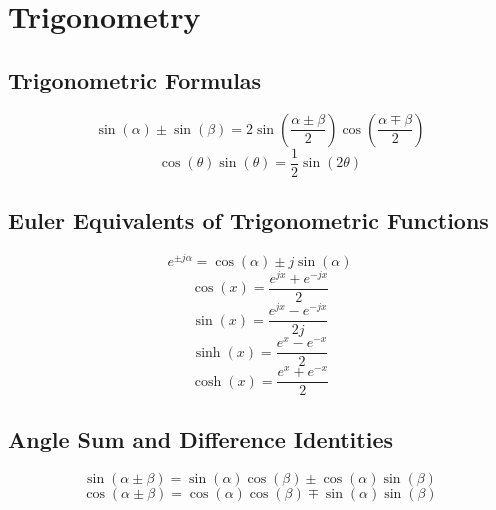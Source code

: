 \section{Trigonometry}\label{app:Trig}
\subsection{Trigonometric Formulas}\label{subsec:Trig Formulas}
\begin{equation}\label{eq:Sin plus Sin with diff Angles}
  \sin(\alpha) \pm \sin(\beta) = 2 \sin \left( \frac{\alpha \pm \beta}{2} \right) \cos\left( \frac{\alpha \mp \beta}{2} \right)
\end{equation}
\begin{equation}\label{eq:Cosine-Sine Product}
  \cos \left( \theta \right) \sin \left( \theta \right) = \frac{1}{2} \sin \left( 2 \theta \right)
\end{equation}

\subsection{Euler Equivalents of Trigonometric Functions}\label{subsec:Euler Equivalents}
\begin{equation}\label{eq:Euler Complex}
  e^{\pm j \alpha} = \cos \left( \alpha \right) \pm j \sin \left( \alpha \right)
\end{equation}
\begin{equation}\label{eq:Euler Sin}
  \cos \left( x \right) = \frac{e^{j x} + e^{-j x}}{2}
\end{equation}
\begin{equation}\label{eq:Euler Cos}
  \sin \left( x \right) = \frac{e^{j x} - e^{-j x}}{2 j}
\end{equation}
\begin{equation}\label{eq:Euler Sinh}
  \sinh \left( x \right) = \frac{e^{x} - e^{-x}}{2}
\end{equation}
\begin{equation}\label{eq:Euler Cosh}
  \cosh \left( x \right) = \frac{e^{x} + e^{-x}}{2}
\end{equation}

\subsection{Angle Sum and Difference Identities}\label{subsec:Angle Sum and Difference Identities}
\begin{equation}\label{eq:Sin Angle Sum and Difference}
  \sin \left( \alpha \pm \beta \right) = \sin \left( \alpha \right) \cos \left( \beta \right) \pm \cos \left( \alpha \right) \sin \left( \beta \right)
\end{equation}
\begin{equation}\label{eq:Cos Angle Sum and Difference}
  \cos \left( \alpha \pm \beta \right) = \cos \left( \alpha \right) \cos \left( \beta \right) \mp \sin \left( \alpha \right) \sin \left( \beta \right)
\end{equation}

